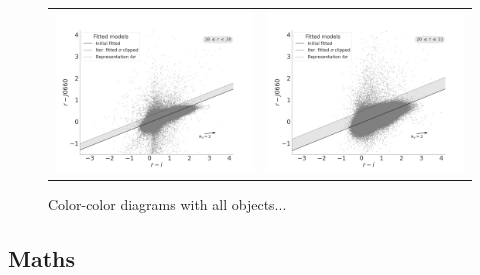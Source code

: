 \documentclass[fleqn,usenatbib]{mnras}
\begin{document}
\begin{figure}
\begin{tabular}{ll}
    \includegraphics[trim=10 0 65 20, clip]{Figs/diagram-DR3-errorFlag0-3f-18r20}
    & \includegraphics[trim=10 0 65 20, clip]{Figs/diagram-DR3-errorFlag0-3f-20r21}\\
  \end{tabular}
  \caption{Color-color diagrams with all objects...}
  \label{fig:color-diagram}
\end{figure}



\subsection{Maths}
\label{sec:maths} %
\end{document}
